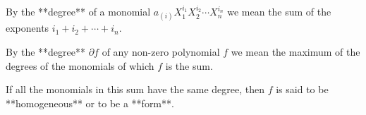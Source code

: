 By the **degree** of a monomial $a_{(i)} X_1^{i_1} X_2^{i_2} \cdots X_n^{i_n}$ we mean the sum of the exponents $i_1 + i_2 + \cdots + i_n$.

By the **degree** $\partial f$ of any non-zero polynomial $f$ we mean the maximum of the degrees of the monomials of which $f$ is the sum.

If all the monomials in this sum have the same degree, then $f$ is said to be **homogeneous** or to be a **form**.
